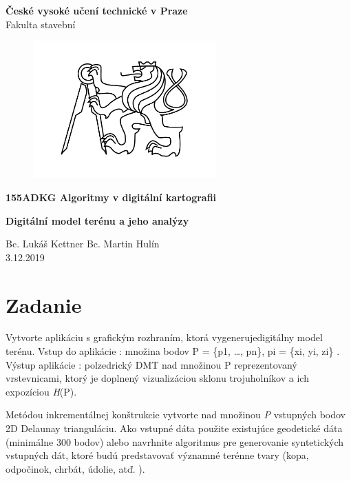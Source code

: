\documentclass[12pt]{article}
\begin{document}
\begin{titlepage}
\centering
\Large \textbf{České vysoké učení technické v Praze }\\ Fakulta stavební
\vspace{2cm}

\begin{figure}[h!] %
\centering
\includegraphics[width=7cm]{./img/cvut.png}
\end{figure}
 
\Large \textbf{155ADKG Algoritmy v digitální kartografii}
\vspace{1cm}

\LARGE  \textbf{ Digitální model terénu a jeho analýzy}
\vspace{3cm}

\Large Bc. Lukáš Kettner Bc. Martin Hulín \\ 3.12.2019

 \thispagestyle{empty} %
\end{titlepage}

\tableofcontents    %
\newpage %
\section{Zadanie}
Vytvorte aplikáciu s grafickým rozhraním, ktorá vygenerujedigitálny model terénu. Vstup do aplikácie : množina bodov P = \{p1, …, pn\},  p{i} = \{x{i}, y{i}, z{i}\} .
\newline Výstup aplikácie : polzedrický DMT nad množinou P reprezentovaný vrstevnicami, ktorý je doplnený vizualizáciou sklonu trojuholníkov a ich expozíciou  \textit{H}(P).

Metódou inkrementálnej konštrukcie vytvorte nad množinou   \textit{P} vstupných bodov 2D Delaunay trianguláciu. Ako vstupné dáta použite existujúce geodetické dáta (minimálne 300 bodov) alebo navrhnite algoritmus pre generovanie syntetických vstupných dát, ktoré budú predstavovať významné terénne tvary (kopa, odpočinok, chrbát, údolie, atď. ).
\end{document}
